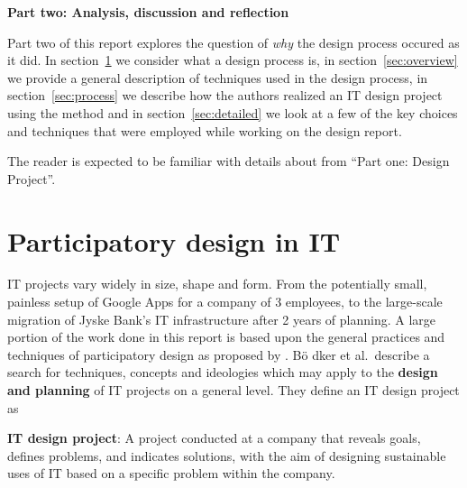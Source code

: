 \setcounter{section}{0}
\setcounter{figure}{0}
\setcounter{table}{0}
\newpage
\textbf{\LARGE{{Part two: Analysis, discussion and reflection}}}\\


Part two of this report explores the question of \textit{why}
the design process occured as it did. In section~\ref{sec:participatory}
we consider what a design process is, in section~\ref{sec:overview}
we provide a general description of techniques used in the design process,
in section~\ref{sec:process} we describe how the authors realized an IT design
project using the \must{} method and in section~\ref{sec:detailed} we
look at a few of the key choices and techniques that were employed while working
on the design report.

The reader is expected to be familiar with details about \gomonkey{} 
from ``Part one: Design Project''.

\section{Participatory design in IT} \label{sec:participatory}

IT projects vary widely in size, shape and form. From the potentially small, painless 
setup of Google Apps for a company of 3 employees, to the large-scale migration of
Jyske Bank's IT infrastructure after 2 years of planning\cite{jyskebank}.
A large portion of the work done in this report is based upon the general
practices and techniques of participatory design as proposed by \cite{bodker2004participatory}.
B\"o dker et al.\ describe a search for techniques, concepts and ideologies which may apply
to the \textbf{design and planning} of IT projects on a general level. They
define an IT design project as
\begin{figure*}[h!]
    \centering
    \textbf{IT design project}: A project conducted at a company that reveals
    goals, defines problems, and indicates solutions, with the aim of designing
    sustainable uses of IT based on a specific problem within the company.
\end{figure*}

